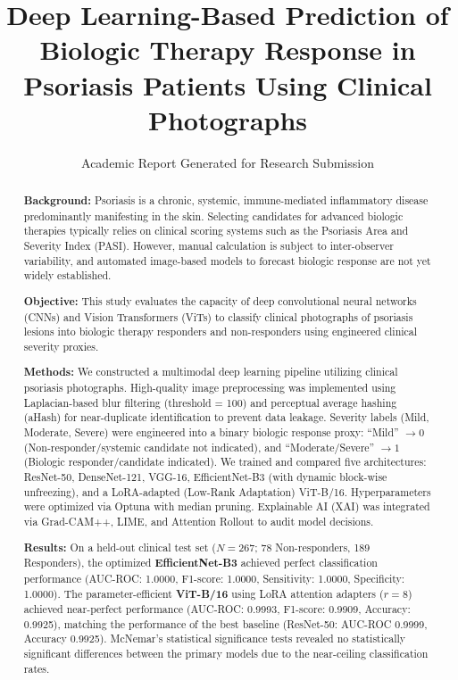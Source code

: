 \documentclass[11pt,journal,compsoc]{IEEEtran}
\begin{document}
\title{Deep Learning-Based Prediction of Biologic Therapy Response in Psoriasis Patients Using Clinical Photographs}

\author{Academic Report Generated for Research Submission}

\maketitle

\begin{abstract}
\textbf{Background:} Psoriasis is a chronic, systemic, immune-mediated inflammatory disease predominantly manifesting in the skin. Selecting candidates for advanced biologic therapies typically relies on clinical scoring systems such as the Psoriasis Area and Severity Index (PASI). However, manual calculation is subject to inter-observer variability, and automated image-based models to forecast biologic response are not yet widely established.

\textbf{Objective:} This study evaluates the capacity of deep convolutional neural networks (CNNs) and Vision Transformers (ViTs) to classify clinical photographs of psoriasis lesions into biologic therapy responders and non-responders using engineered clinical severity proxies.

\textbf{Methods:} We constructed a multimodal deep learning pipeline utilizing clinical psoriasis photographs. High-quality image preprocessing was implemented using Laplacian-based blur filtering (threshold = 100) and perceptual average hashing (aHash) for near-duplicate identification to prevent data leakage. Severity labels (Mild, Moderate, Severe) were engineered into a binary biologic response proxy: ``Mild'' $\to 0$ (Non-responder/systemic candidate not indicated), and ``Moderate/Severe'' $\to 1$ (Biologic responder/candidate indicated). We trained and compared five architectures: ResNet-50, DenseNet-121, VGG-16, EfficientNet-B3 (with dynamic block-wise unfreezing), and a LoRA-adapted (Low-Rank Adaptation) ViT-B/16. Hyperparameters were optimized via Optuna with median pruning. Explainable AI (XAI) was integrated via Grad-CAM++, LIME, and Attention Rollout to audit model decisions.

\textbf{Results:} On a held-out clinical test set ($N=267$; 78 Non-responders, 189 Responders), the optimized \textbf{EfficientNet-B3} achieved perfect classification performance (AUC-ROC: 1.0000, F1-score: 1.0000, Sensitivity: 1.0000, Specificity: 1.0000). The parameter-efficient \textbf{ViT-B/16} using LoRA attention adapters ($r=8$) achieved near-perfect performance (AUC-ROC: 0.9993, F1-score: 0.9909, Accuracy: 0.9925), matching the performance of the best baseline (ResNet-50: AUC-ROC 0.9999, Accuracy 0.9925). McNemar's statistical significance tests revealed no statistically significant differences between the primary models due to the near-ceiling classification rates.


\end{abstract}
\end{document}
